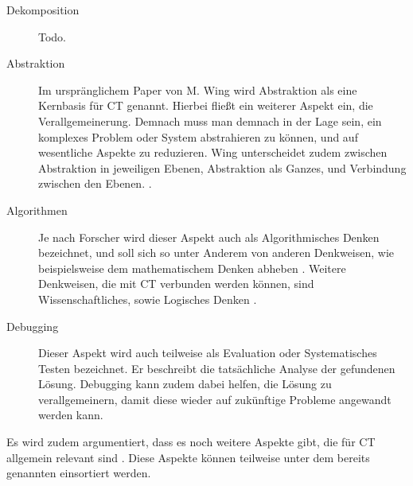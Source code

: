 \begin{description}
    \item[Dekomposition] Todo.
    \item[Abstraktion] Im urspränglichem Paper von M. Wing wird Abstraktion als eine Kernbasis für CT genannt. Hierbei fließt ein weiterer Aspekt ein, die Verallgemeinerung.
    Demnach muss man demnach in der Lage sein, ein komplexes Problem oder System abstrahieren zu können, und auf wesentliche Aspekte zu reduzieren. Wing unterscheidet zudem zwischen Abstraktion in jeweiligen Ebenen, Abstraktion als Ganzes, und Verbindung zwischen den Ebenen. \cite{wing2008}.
    \item[Algorithmen] Je nach Forscher wird dieser Aspekt auch als Algorithmisches Denken bezeichnet, und soll sich so unter Anderem von anderen Denkweisen, wie beispielsweise dem mathematischem Denken abheben \cite{schute}. Weitere Denkweisen, die mit CT verbunden werden können, sind Wissenschaftliches, sowie Logisches Denken \cite{curzon}.
    \item[Debugging] Dieser Aspekt wird auch teilweise als Evaluation \cite{curzon} oder Systematisches Testen \cite{wing2006} bezeichnet. Er beschreibt die tatsächliche Analyse der gefundenen Lösung. Debugging kann zudem dabei helfen, die Lösung zu verallgemeinern, damit diese wieder auf zukünftige Probleme angewandt werden kann.
\end{description}

Es wird zudem argumentiert, dass es noch weitere Aspekte gibt, die für CT allgemein relevant sind \cite{curzon}. Diese Aspekte können teilweise unter dem bereits genannten einsortiert werden.

